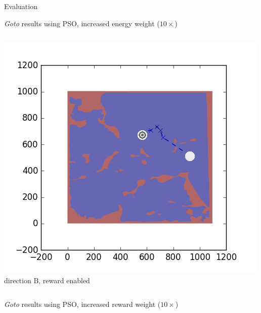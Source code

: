 \documentclass[9pt]{beamer}
\begin{document}
\begin{frame}{Evaluation}
\begin{block}{\textit{Goto} results using PSO, increased energy weight ($10\times$)}
\begin{columns}
\begin{column}{0.25\textwidth}
\begin{center}
                    \includegraphics[width=\textwidth,trim={2cm 2cm 2cm 2cm},clip]{img/EXP3RG_PathBb_-1_-1_0d001_-1.png}
                    \newline
                    \tiny{direction B, reward enabled}
                \end{center}
            \end{column}
        \end{columns}
    \end{block}
    \begin{block}{\textit{Goto} results using PSO, increased reward weight ($10\times$)}
        \begin{columns}
            \begin{column}{0.25\textwidth}
                \begin{center}

\end{center}
\end{column}
\end{columns}
\end{block}
\end{frame}
\end{document}

